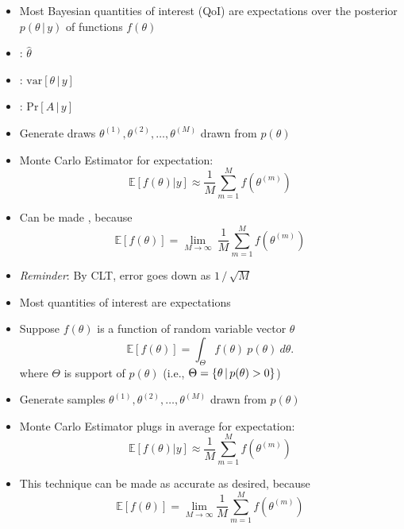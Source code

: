 \documentclass[10pt]{report}
\begin{document}
%
\begin{itemize}
\item Most Bayesian quantities of interest (QoI) are expectations
  over the posterior $p(\theta \, | \, y)$ of functions $f(\theta)$
\item {}: $\hat{\theta}$
\item {}:
  $\mathrm{var}[\theta \, | \, y]$
\item {}:  $\mbox{Pr}[A \, | \, y]$
\end{itemize}


%
\begin{itemize}
\item Generate draws $\theta^{(1)}, \theta^{(2)}, \ldots,
  \theta^{(M)}$ drawn from $p(\theta)$
\item Monte Carlo Estimator  for expectation:
  \[
  \mathbb{E}[f(\theta)|y] \approx \frac{1}{M} \sum_{m=1}^M f(\theta^{(m)})
  \]
\item Can be made , because
\[
\mathbb{E}[f(\theta)]
=
\lim_{M \rightarrow \infty} \
\frac{1}{M} \sum_{m=1}^M f(\theta^{(m)})
\]
\vfill
\item {\slshape Reminder}:  By CLT, error goes down as
$1 \, / \, \sqrt{M}$
\end{itemize}


%
\begin{itemize}
\item Most quantities of interest are expectations
\item Suppose $f(\theta)$ is a function of random variable vector $\theta$
  \[
  \mathbb{E}[f(\theta)] = \int_{\Theta} f(\theta) \ p(\theta) \ d\theta.
  \]
where $\Theta$ is support of $p(\theta)$ (i.e., $\Theta =
\{ \theta \, | \, p(\theta) > 0 \}$)
\item Generate samples $\theta^{(1)}, \theta^{(2)}, \ldots,
  \theta^{(M)}$ drawn from $p(\theta)$
\item Monte Carlo Estimator plugs in average for expectation:
  \[
  \mathbb{E}[f(\theta)|y] \approx \frac{1}{M} \sum_{m=1}^M f(\theta^{(m)})
  \]
\item This technique can be made as accurate as desired, because
\[
\mathbb{E}[f(\theta)]
=
\lim_{M \rightarrow \infty}
\frac{1}{M} \sum_{m=1}^M f(\theta^{(m)})
\]
\end{itemize}
\end{document}
